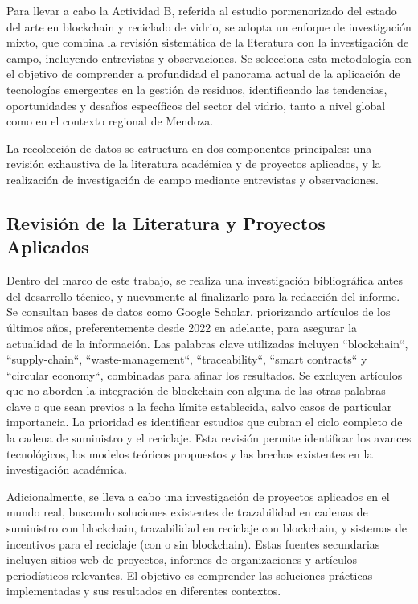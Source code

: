 Para llevar a cabo la Actividad B, referida al estudio pormenorizado del estado del arte en blockchain y reciclado de vidrio, se adopta un enfoque de investigación mixto, que combina la revisión sistemática de la literatura con la investigación de campo, incluyendo entrevistas y observaciones. Se selecciona esta metodología con el objetivo de comprender a profundidad el panorama actual de la aplicación de tecnologías emergentes en la gestión de residuos, identificando las tendencias, oportunidades y desafíos específicos del sector del vidrio, tanto a nivel global como en el contexto regional de Mendoza.

La recolección de datos se estructura en dos componentes principales: una revisión exhaustiva de la literatura académica y de proyectos aplicados, y la realización de investigación de campo mediante entrevistas y observaciones.

\subsection{Revisión de la Literatura y Proyectos Aplicados}

Dentro del marco de este trabajo, se realiza una investigación bibliográfica antes del desarrollo técnico, y nuevamente al finalizarlo para la redacción del informe. Se consultan bases de datos como Google Scholar, priorizando artículos de los últimos años, preferentemente desde 2022 en adelante, para asegurar la actualidad de la información. Las palabras clave utilizadas incluyen ``blockchain``, ``supply-chain``, ``waste-management``, ``traceability``, ``smart contracts`` y ``circular economy``, combinadas para afinar los resultados. Se excluyen artículos que no aborden la integración de blockchain con alguna de las otras palabras clave o que sean previos a la fecha límite establecida, salvo casos de particular importancia. La prioridad es identificar estudios que cubran el ciclo completo de la cadena de suministro y el reciclaje. Esta revisión permite identificar los avances tecnológicos, los modelos teóricos propuestos y las brechas existentes en la investigación académica.

Adicionalmente, se lleva a cabo una investigación de proyectos aplicados en el mundo real, buscando soluciones existentes de trazabilidad en cadenas de suministro con blockchain, trazabilidad en reciclaje con blockchain, y sistemas de incentivos para el reciclaje (con o sin blockchain). Estas fuentes secundarias incluyen sitios web de proyectos, informes de organizaciones y artículos periodísticos relevantes. El objetivo es comprender las soluciones prácticas implementadas y sus resultados en diferentes contextos.

